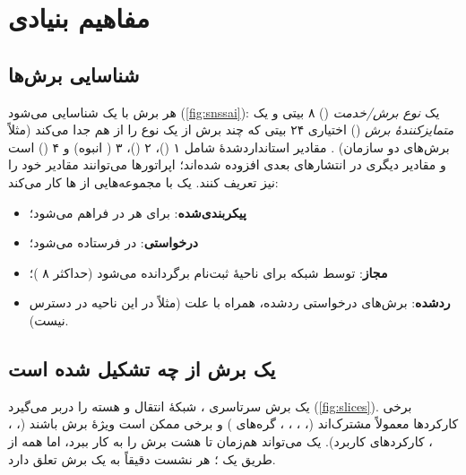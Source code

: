 \documentclass[11pt,a4paper]{article}
\begin{document}
\section{مفاهیم بنیادی}

\subsection{شناسایی برش‌ها}
هر برش با یک  شناسایی می‌شود (\cref{fig:snssai}): یک \emph{نوع برش/خدمت} () ۸ بیتی و یک \emph{متمایزکنندهٔ برش}
() اختیاری ۲۴ بیتی که چند برش از یک نوع را از هم جدا می‌کند (مثلاً برش‌های  دو سازمان) \cite{ts23003}. مقادیر
استانداردشدهٔ  شامل ۱ ()، ۲ ()، ۳ ( انبوه) و ۴ () است و مقادیر دیگری در انتشارهای
بعدی افزوده شده‌اند؛ اپراتورها می‌توانند مقادیر خود را نیز تعریف کنند. یک  با مجموعه‌هایی از ها کار می‌کند:
\begin{itemize}
  \item \textbf{ پیکربندی‌شده}: برای هر  در  فراهم می‌شود؛
  \item \textbf{ درخواستی}: در  فرستاده می‌شود؛
  \item \textbf{ مجاز}: توسط شبکه برای ناحیهٔ ثبت‌نام برگردانده می‌شود (حداکثر ۸ )؛
  \item \textbf{ ردشده}: برش‌های درخواستی ردشده، همراه با علت (مثلاً در این ناحیه در دسترس نیست).
\end{itemize}

\begin{acnfigure}
  \caption{ساختار  و مجموعه‌های  مبادله‌شده هنگام ثبت‌نام.}
  \label{fig:snssai}
\end{acnfigure}

\subsection{یک برش از چه تشکیل شده است}
یک برش سرتاسری ، شبکهٔ انتقال و هسته را دربر می‌گیرد (\cref{fig:slices}). برخی کارکردها معمولاً مشترک‌اند (،
، ، ، گره‌های ) و برخی ممکن است ویژهٔ برش باشند (، ، ،
کارکردهای کاربرد). یک  می‌تواند هم‌زمان تا هشت برش را به کار ببرد، اما همه از طریق یک ؛ هر نشست 
دقیقاً به یک برش تعلق دارد.
\end{document}
